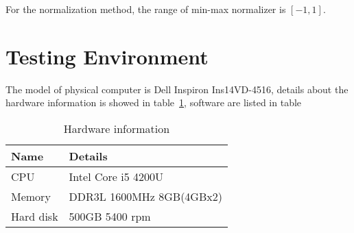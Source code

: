 For the normalization method, the range of min-max normalizer is $ [-1, 1] $.


\section{Testing Environment}
The model of physical computer is Dell Inspiron Ins14VD-4516, details about the hardware information is showed in table~\ref{tb:hardwareConf}, software are listed in table
\begin{table}[h]
	\centering
	\begin{tabular}{|l|l|}
		\hline
		\textbf{Name} & \textbf{Details} \\ \hline
		CPU & Intel Core i5 4200U \\ \hline
		Memory & DDR3L 1600MHz 8GB(4GBx2) \\ \hline
		Hard disk & 500GB 5400 rpm \\ \hline
	\end{tabular}
	\caption{Hardware information}
	\label{tb:hardwareConf}
\end{table}

